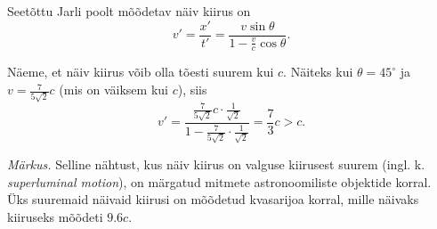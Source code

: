 Seetõttu Jarli poolt mõõdetav näiv kiirus on
\begin{equation*}
v' = \frac{x'}{t'} = \frac{v \sin \theta}{1- \frac{v}{c}\cos\theta}.
\end{equation*}

Näeme, et näiv kiirus võib olla tõesti suurem kui $c$. Näiteks kui $\theta = 45^\circ$ ja $v = \frac{7}{5\sqrt 2}c$ (mis on väiksem kui $c$), siis
\begin{equation*}
v' = \frac{\frac{7}{5\sqrt 2} c \cdot \frac{1}{\sqrt 2}}{1- \frac{7}{5\sqrt 2} \cdot \frac{1}{\sqrt 2}} = \frac{7}{3} c > c.
\end{equation*}

\textit{Märkus.} Selline nähtust, kus näiv kiirus on valguse kiirusest suurem (ingl. k. \textit{superluminal motion}), on märgatud mitmete astronoomiliste objektide korral. Üks suuremaid näivaid kiirusi on mõõdetud kvasarijoa korral, mille näivaks kiiruseks mõõdeti $\num{9.6}c$.
\probend